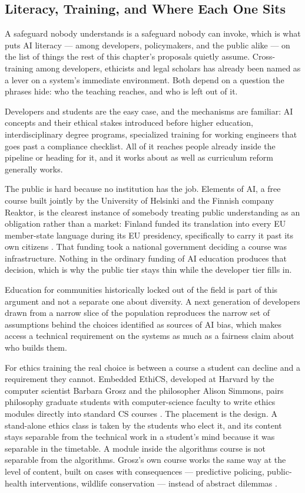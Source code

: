 \subsection{Literacy, Training, and Where Each One Sits}
\label{sec:8.3.5}
A safeguard nobody understands is a safeguard nobody can invoke, which is what puts AI literacy — among developers, policymakers, and the public alike — on the list of things the rest of this chapter's proposals quietly assume. Cross-training among developers, ethicists and legal scholars has already been named as a lever on a system's immediate environment. Both depend on a question the phrases hide: who the teaching reaches, and who is left out of it.

Developers and students are the easy case, and the mechanisms are familiar: AI concepts and their ethical stakes introduced before higher education, interdisciplinary degree programs, specialized training for working engineers that goes past a compliance checklist. All of it reaches people already inside the pipeline or heading for it, and it works about as well as curriculum reform generally works.

The public is hard because no institution has the job. Elements of AI, a free course built jointly by the University of Helsinki and the Finnish company Reaktor, is the clearest instance of somebody treating public understanding as an obligation rather than a market: Finland funded its translation into every EU member-state language during its EU presidency, specifically to carry it past its own citizens \autocite{helsinki2020elements}. That funding took a national government deciding a course was infrastructure. Nothing in the ordinary funding of AI education produces that decision, which is why the public tier stays thin while the developer tier fills in.

Education for communities historically locked out of the field is part of this argument and not a separate one about diversity. A next generation of developers drawn from a narrow slice of the population reproduces the narrow set of assumptions behind the choices identified as sources of AI bias, which makes access a technical requirement on the systems as much as a fairness claim about who builds them.

For ethics training the real choice is between a course a student can decline and a requirement they cannot. Embedded EthiCS, developed at Harvard by the computer scientist Barbara Grosz and the philosopher Alison Simmons, pairs philosophy graduate students with computer-science faculty to write ethics modules directly into standard CS courses \autocite{grosz2019embedded}. The placement is the design. A stand-alone ethics class is taken by the students who elect it, and its content stays separable from the technical work in a student's mind because it was separable in the timetable. A module inside the algorithms course is not separable from the algorithms. Grosz's own course works the same way at the level of content, built on cases with consequences — predictive policing, public-health interventions, wildlife conservation — instead of abstract dilemmas \autocite{harvardgazette2019ethics,harvardcs108schedule}.

